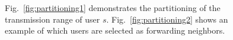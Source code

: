 \begin{figure}
\centering
{} \hspace{6mm}
\caption{\label{fig:partitioning}\cite{dtc2}   Fig.~\ref{fig:partitioning1} demonstrates the partitioning of the transmission range of user $s$. Fig.~\ref{fig:partitioning2} shows an example of which users are selected as forwarding neighbors. }
\end{figure}

